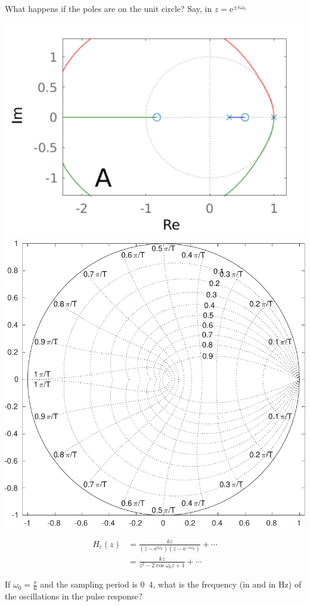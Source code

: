 \documentclass[presentation,aspectratio=169]{beamer}
\begin{document}
\begin{frame}[label={sec:orgb1ee06f}]{What happens if the poles are \alert{on the} unit circle?}
Say, in \(z = \mathrm{e}^{\pm i \omega_0}\)
\begin{center}
\includegraphics[width=0.3\linewidth]{../../figures/rlocusA.png}
\includegraphics[height=0.34\textheight]{../../figures/zgrid-crop}\\
\end{center}

\begin{align*}
H_c(z) &= \frac{k z}{(z-\mathrm{e}^{i \omega_0})(z-\mathrm{e}^{-i \omega_0})} + \cdots\\
       &= \frac{k z}{z^2 -2\cos\omega_0 z + 1} + \cdots
\end{align*}

If \(\omega_0 = \frac{\pi}{6}\) and the sampling period is \unit{0.4}{\second}, what is the \alert{frequency} (in \unit{}{\radian\per\second} and in Hz) of the oscillations in the pulse response?
\end{frame}
\end{document}

